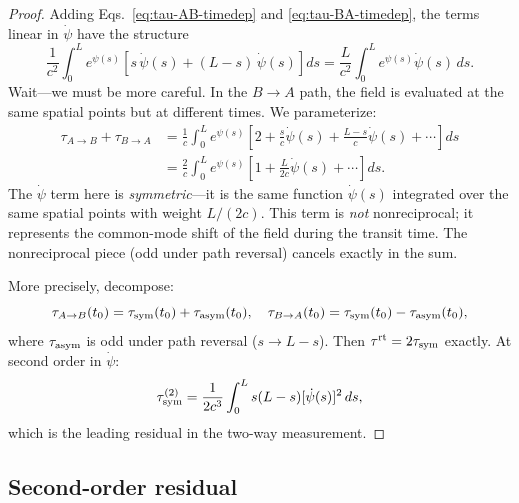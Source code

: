 \documentclass[aps,prd,twocolumn,superscriptaddress,nofootinbib,longbibliography]{revtex4-2}
\begin{document}
\begin{proof}
Adding Eqs.~\eqref{eq:tau-AB-timedep} and \eqref{eq:tau-BA-timedep}, the
terms linear in $\dot{\psi}$ have the structure
\begin{equation}
\frac{1}{c^2}\int_0^L e^{\psi(s)}\left[s\,\dot{\psi}(s) + (L-s)\,\dot{\psi}(s)\right]ds
= \frac{L}{c^2}\int_0^L e^{\psi(s)}\dot{\psi}(s)\,ds.
\end{equation}
Wait---we must be more careful. In the $B\to A$ path, the field is evaluated
at the same spatial points but at different times. We parameterize:
\begin{align}
\tau_{A\to B} + \tau_{B\to A} &= \frac{1}{c}\int_0^L e^{\psi(s)}\left[
2 + \frac{s}{c}\dot{\psi}(s) + \frac{L-s}{c}\dot{\psi}(s) + \cdots\right]ds \nonumber\\
&= \frac{2}{c}\int_0^L e^{\psi(s)}\left[1 + \frac{L}{2c}\dot{\psi}(s) + \cdots\right]ds.
\end{align}
The $\dot{\psi}$ term here is \emph{symmetric}---it is the same function
$\dot{\psi}(s)$ integrated over the same spatial points with weight $L/(2c)$.
This term is \emph{not} nonreciprocal; it represents the common-mode shift
of the field during the transit time. The nonreciprocal piece (odd under
path reversal) cancels exactly in the sum.

More precisely, decompose:
\begin{equation}
\tau_{A\to B}(t_0) = \tau_{\rm sym}(t_0) + \tau_{\rm asym}(t_0), \quad
\tau_{B\to A}(t_0) = \tau_{\rm sym}(t_0) - \tau_{\rm asym}(t_0),
\end{equation}
where $\tau_{\rm asym}$ is odd under path reversal ($s \to L-s$). Then
$\tau^{\rm rt} = 2\tau_{\rm sym}$ exactly. At second order in $\dot{\psi}$:
\begin{equation}
\tau_{\rm sym}^{(2)} = \frac{1}{2c^3}\int_0^L s(L-s)[\dot{\psi}(s)]^2\,ds,
\end{equation}
which is the leading residual in the two-way measurement.
\end{proof}

\subsection{Second-order residual}\label{sec:second-order-residual}
\end{document}
